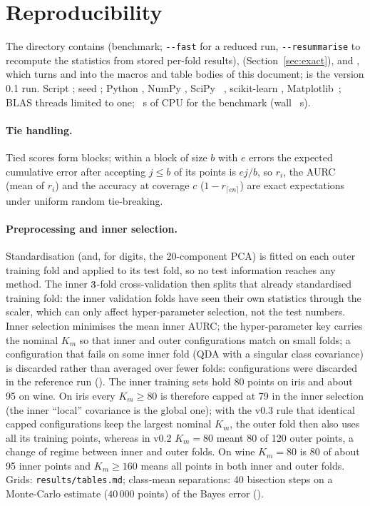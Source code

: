 \documentclass[10pt,a4paper]{article}
\theoremstyle{plain}
\theoremstyle{definition}
\theoremstyle{remark}
\begin{document}
\section{Reproducibility}\label{app:repro}
{\sloppy The directory contains  (benchmark; \texttt{-{}-fast} for a reduced run, \texttt{-{}-resummarise} to recompute the statistics from stored per-fold results),  (Section~\ref{sec:exact}),  and , which turns  and  into the macros and table bodies of this document;  is the version 0.1 run. Script \MetaVersion; seed \MetaSeed; Python \MetaPython, NumPy \MetaNumpy, SciPy \MetaScipy~\citep{virtanen2020}, scikit-learn \MetaSklearn, Matplotlib~\citep{hunter2007}; BLAS threads limited to one; \MetaCpuSeconds~s of CPU for the benchmark (wall \MetaWallSeconds~s).\par}

\paragraph{Tie handling.} Tied scores form blocks; within a block of size $b$ with $e$ errors the expected cumulative error after accepting $j\le b$ of its points is $ej/b$, so $r_i$, the AURC (mean of $r_i$) and the accuracy at coverage $c$ ($1-r_{\lceil cn\rceil}$) are exact expectations under uniform random tie-breaking.

\paragraph{Preprocessing and inner selection.} Standardisation (and, for digits, the 20-component PCA) is fitted on each outer training fold and applied to its test fold, so no test information reaches any method. The inner $3$-fold cross-validation then splits that already standardised training fold: the inner validation folds have seen their own statistics through the scaler, which can only affect hyper-parameter selection, not the test numbers. Inner selection minimises the mean inner AURC; the hyper-parameter key carries the nominal $K_m$ so that inner and outer configurations match on small folds; a configuration that fails on some inner fold (QDA with a singular class covariance) is discarded rather than averaged over fewer folds: \DroppedConfigs{} configurations were discarded in the reference run (\DroppedConfigsList). The inner training sets hold 80 points on iris and about 95 on wine. On iris every $K_m\ge80$ is therefore capped at 79 in the inner selection (the inner ``local'' covariance is the global one); with the v0.3 rule that identical capped configurations keep the largest nominal $K_m$, the outer fold then also uses all its training points, whereas in v0.2 $K_m=80$ meant 80 of 120 outer points, a change of regime between inner and outer folds. On wine $K_m=80$ is 80 of about 95 inner points and $K_m\ge160$ means all points in both inner and outer folds. Grids: \texttt{results/tables.md}; class-mean separations: 40 bisection steps on a Monte-Carlo estimate ($40\,000$ points) of the Bayes error ().
\end{document}
